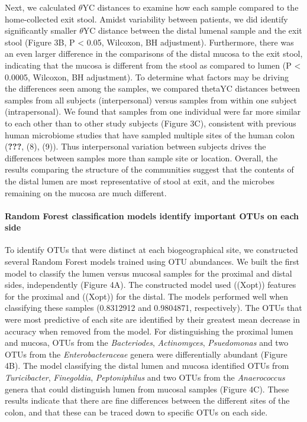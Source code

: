 \documentclass[11pt,]{article}
\let\oldparagraph\paragraph
\renewcommand{\paragraph}[1]{\oldparagraph{#1}\mbox{}}
\begin{document}
Next, we calculated \({\theta}\)YC distances to examine how each sample
compared to the home-collected exit stool. Amidst variability between
patients, we did identify significantly smaller \({\theta}\)YC distance
between the distal lumenal sample and the exit stool (Figure 3B, P
\textless{} 0.05, Wilcoxon, BH adjustment). Furthermore, there was an
even larger difference in the comparisons of the distal mucosa to the
exit stool, indicating that the mucosa is different from the stool as
compared to lumen (P \textless{} 0.0005, Wilcoxon, BH adjustment). To
determine what factors may be driving the differences seen among the
samples, we compared thetaYC distances between samples from all subjects
(interpersonal) versus samples from within one subject (intrapersonal).
We found that samples from one individual were far more similar to each
other than to other study subjects (Figure 3C), consistent with previous
human microbiome studies that have sampled multiple sites of the human
colon (\textbf{???}, (8), (9)). Thus interpersonal variation between
subjects drives the differences between samples more than sample site or
location. Overall, the results comparing the structure of the
communities suggest that the contents of the distal lumen are most
representative of stool at exit, and the microbes remaining on the
mucosa are much different.

\paragraph{Random Forest classification models identify important OTUs
on each
side}\label{random-forest-classification-models-identify-important-otus-on-each-side}

To identify OTUs that were distinct at each biogeographical site, we
constructed several Random Forest models trained using OTU abundances.
We built the first model to classify the lumen versus mucosal samples
for the proximal and distal sides, independently (Figure 4A). The
constructed model used ((Xopt)) features for the proximal and ((Xopt))
for the distal. The models performed well when classifying these samples
(0.8312912 and 0.9804871, respectively). The OTUs that were most
predictive of each site are identified by their greatest mean decrease
in accuracy when removed from the model. For distinguishing the proximal
lumen and mucosa, OTUs from the \emph{Bacteriodes}, \emph{Actinomyces},
\emph{Psuedomonas} and two OTUs from the \emph{Enterobacteraceae} genera
were differentially abundant (Figure 4B). The model classifying the
distal lumen and mucosa identified OTUs from \emph{Turicibacter},
\emph{Finegoldia}, \emph{Peptoniphilus} and two OTUs from the
\emph{Anaerococcus} genera that could distinguish lumen from mucosal
samples (Figure 4C). These results indicate that there are fine
differences between the different sites of the colon, and that these can
be traced down to specific OTUs on each side.
\end{document}
